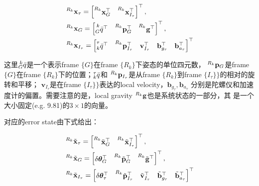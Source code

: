 \documentclass[a4paper, UTF8, fontset=adobe]{ctexart}
\begin{document}
\begin{equation}
\begin{aligned}
\numberwithin{equation}{section} %
& \prescript{R_k}{}{\mathbf{x}_{\tau}} = \begin{bmatrix} \prescript{R_k}{}{\mathbf{x}^{\top}_G} & 
  \prescript{R_k}{}{\mathbf{x}^{\top}_{I_{\tau}}} \end{bmatrix}^{\top}, \\
& \prescript{R_k}{}{\mathbf{x}_G} = \begin{bmatrix} \prescript{k}{G}{\bar{q}^{\top}} & 
  \prescript{R_k}{}{\mathbf{p}^{\top}_G} & \prescript{R_k}{}{\mathbf{g}^{\top}} \end{bmatrix}^{\top}, \\
& \prescript{R_k}{}{\mathbf{x}_{I_{\tau}}} = \begin{bmatrix} \prescript{\tau}{k}{\bar{q}^{\top}} & 
  \prescript{R_k}{}{\mathbf{p}^{\top}_{I_{\tau}}} & \mathbf{v}^{\top}_{I_{\tau}} &
  \mathbf{b}_{g_{\tau}}^{\top} & \mathbf{b}_{a_{\tau}}^{\top} \end{bmatrix}^{\top} 
\end{aligned}
\end{equation}

\noindent 这里$\prescript{k}{G}{\bar{q}}$是一个表示frame $\{G\}$在frame $\{R_k\}$下姿态的单位四元数，
$\prescript{R_k}{}{\mathbf{p}_G}$是frame $\{G\}$在frame $\{R_k\}$下的位置；$\prescript{\tau}{k}{\bar{q}}$和 
$\prescript{R_k}{}{\mathbf{p}_{I_{\tau}}}$是从frame $\{R_k\}$到frame $\{I_{\tau}\}\}$的相对的旋转和平移；
$\mathbf{v}_{I_{\tau}}$是在frame $\{I_{\tau}\}\}$表达的local velocity，$\mathbf{b}_{g_\tau}, \mathbf{b}_{a_\tau}$
分别是陀螺仪和加速度计的偏置。需要注意的是，local gravity $\prescript{R_k}{}{\mathbf{g}}$也是系统状态的一部分，其
是一个大小固定(e.g. 9.81)的$3\times1$的向量。

\noindent 对应的error state由下式给出：

\begin{equation}
\begin{aligned}
\numberwithin{equation}{section} %
& \prescript{R_k}{}{\tilde{\mathbf{x}}_{\tau}} = \begin{bmatrix} \prescript{R_k}{}{\tilde{\mathbf{x}}^{\top}_G} & 
\prescript{R_k}{}{\tilde{\mathbf{x}}^{\top}_{I_{\tau}}} \end{bmatrix}^{\top}, \\
& \prescript{R_k}{}{\tilde{\mathbf{x}}_G} = \begin{bmatrix} \delta\bm{\theta}^{\top}_G & 
\prescript{R_k}{}{\tilde{\mathbf{p}}^{\top}_G} & \prescript{R_k}{}{\tilde{\mathbf{g}}^{\top}} \end{bmatrix}^{\top}, \\
& \prescript{R_k}{}{\tilde{\mathbf{x}}_{I_{\tau}}} = \begin{bmatrix} \delta\bm{\theta}^{\top}_{\tau} & 
\prescript{R_k}{}{\tilde{\mathbf{p}}^{\top}_{I_{\tau}}} & \tilde{\mathbf{v}}^{\top}_{I_{\tau}} &
\tilde{\mathbf{b}}_{g_{\tau}}^{\top} & \tilde{\mathbf{b}}_{a_{\tau}}^{\top} \end{bmatrix}^{\top} 
\end{aligned}
\end{equation}
\end{document}
